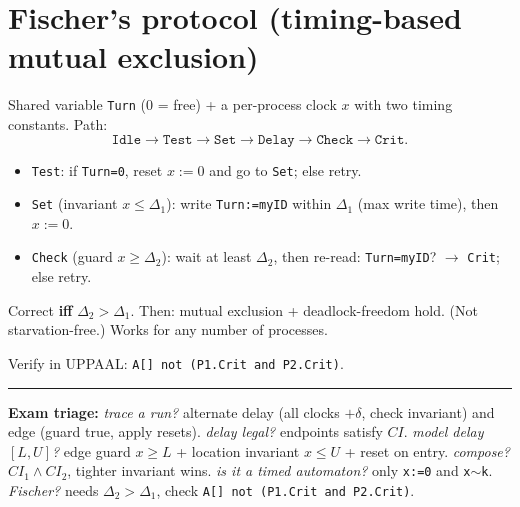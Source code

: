 \section{Fischer's protocol (timing-based mutual exclusion)}
Shared variable \texttt{Turn} (0 = free) + a per-process clock $x$ with two timing constants. Path:
\[\texttt{Idle}\to\texttt{Test}\to\texttt{Set}\to\texttt{Delay}\to\texttt{Check}\to\texttt{Crit}.\]
\begin{itemize}
\item \texttt{Test}: if \texttt{Turn=0}, reset $x{:=}0$ and go to \texttt{Set}; else retry.
\item \texttt{Set} (invariant $x\le\Delta_1$): write \texttt{Turn:=myID} within $\Delta_1$ (max write time), then $x{:=}0$.
\item \texttt{Check} (guard $x\ge\Delta_2$): wait at least $\Delta_2$, then re-read: \texttt{Turn=myID}? $\to$ \texttt{Crit}; else retry.
\end{itemize}
\begin{keybox}
\centering Correct \textbf{iff} $\Delta_2>\Delta_1$. Then: mutual exclusion + deadlock-freedom hold. (Not starvation-free.) Works for any number of processes.
\end{keybox}
Verify in UPPAAL: \texttt{A[] not (P1.Crit and P2.Crit)}.

\vspace{4pt}
\hrule
\vspace{2pt}
{\footnotesize\textbf{Exam triage:} \emph{trace a run?} alternate delay (all clocks $+\delta$, check invariant) and edge (guard true, apply resets). \emph{delay legal?} endpoints satisfy $CI$. \emph{model delay $[L,U]$?} edge guard $x\ge L$ + location invariant $x\le U$ + reset on entry. \emph{compose?} $CI_1\wedge CI_2$, tighter invariant wins. \emph{is it a timed automaton?} only \texttt{x:=0} and \texttt{x$\sim$k}. \emph{Fischer?} needs $\Delta_2>\Delta_1$, check \texttt{A[] not (P1.Crit and P2.Crit)}.}
